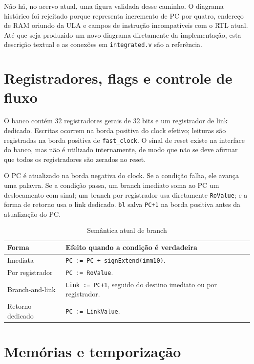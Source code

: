 \documentclass[
  12pt,
  oneside,
  a4paper,
  english,
  french,
  spanish,
  brazilian,
]{abntex2}
\begin{document}
Não há, no acervo atual, uma figura validada desse caminho. O diagrama histórico foi rejeitado porque representa incremento de PC por quatro, endereço de RAM oriundo da ULA e campos de instrução incompatíveis com o RTL atual. Até que seja produzido um novo diagrama diretamente da implementação, esta descrição textual e as conexões em \texttt{integrated.v} são a referência.

\section{Registradores, flags e controle de fluxo}

O banco contém 32 registradores gerais de 32 bits e um registrador de link dedicado. Escritas ocorrem na borda positiva do clock efetivo; leituras são registradas na borda positiva de \texttt{fast\_clock}. O sinal de reset existe na interface do banco, mas não é utilizado internamente, de modo que não se deve afirmar que todos os registradores são zerados no reset.

O PC é atualizado na borda negativa do clock. Se a condição falha, ele avança uma palavra. Se a condição passa, um branch imediato soma ao PC um deslocamento com sinal; um branch por registrador usa diretamente \texttt{RoValue}; e a forma de retorno usa o link dedicado. \texttt{bl} salva \texttt{PC+1} na borda positiva antes da atualização do PC.

\begin{table}[H]
\centering
\ABNTEXfontereduzida
\caption{Semântica atual de branch}
\label{tab:branch}
\begin{tabular}{|p{}|p{}|}
\hline
\textbf{Forma} & \textbf{Efeito quando a condição é verdadeira} \\
\hline
Imediata & \texttt{PC := PC + signExtend(imm10)}. \\
\hline
Por registrador & \texttt{PC := RoValue}. \\
\hline
Branch-and-link & \texttt{Link := PC+1}, seguido do destino imediato ou por registrador. \\
\hline
Retorno dedicado & \texttt{PC := LinkValue}. \\
\hline
\end{tabular}
\end{table}

\section{Memórias e temporização}
\end{document}
